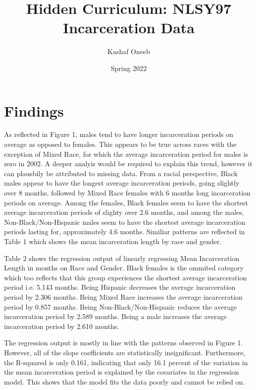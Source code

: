 \documentclass{article}
\author{Kashaf Oneeb}
\title{Hidden Curriculum: NLSY97 Incarceration Data}
\date{Spring 2022}
\begin{document}
\maketitle

\section{Findings}

As reflected in Figure 1, males tend to have longer incarceration periods on average as opposed to females. This appears to be true 
across races with the exception of Mixed Race, for which the average incarceration period for males is zero in 2002. A deeper analyis 
would be required to explain this trend, however it can plausbily be attributed to missing data. From a racial perspective,
Black males appear to have the longest average incarceration periods, going slightly over 8 months, followed by Mixed Race females with 6 months long incarceration periods on average. Among the females, Black females seem to have the shortest average incarceration periods of slighty over 2.6 months, and among the males, Non-Black/Non-Hispanic males seem to have the shortest average incarceration periods lasting for, approximately 4.6 months. Similiar patterns are reflected in Table 1 which shows the mean incarceration length by race and gender.

Table 2 shows the regression output of linearly regressing Mean Incarceration Length in months on Race and Gender. Black females is the
ommited category which too reflects that this group experiences the shortest average incarceration period i.e. 5.143 months. Being Hispanic
decreases the average incarceration period by 2.306 months. Being Mixed Race increases the average incarceration period by 0.857 months.
Being Non-Black/Non-Hispanic reduces the average incarceration period by 2.589 months. Being a male increases the average incarceration period by 2.610 months.

The regression output is mostly in line with the patterns observed in Figure 1. However, all of the slope coefficients are statistically
insignificant. Furthermore, the R-squared is only 0.161, indicating that only 16.1 percent of the variation in the mean incarceration period is explained by the covariates in the regression model. This shows that the model fits the data poorly and cannot be relied on.
\end{document}
